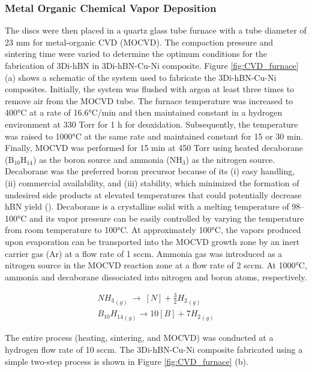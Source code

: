 \subsubsection{Metal Organic Chemical Vapor Deposition}

The discs were then placed in a quartz glass tube furnace with a tube diameter of 23 mm for metal-organic CVD (MOCVD). The compaction pressure and sintering time were varied to determine the optimum conditions for the fabrication of 3Di-hBN in  3Di-hBN-Cu-Ni composite.
Figure \ref{fig:CVD_furnace} (a) shows a schematic of the system used to fabricate the 3Di-hBN-Cu-Ni composites. Initially, the system was flushed with argon at least three times to remove air from the MOCVD tube. The furnace temperature was increased to 400°C at a rate of 16.6°C/min and then maintained constant in a hydrogen environment at 330 Torr for 1 h for deoxidation. Subsequently, the temperature was raised to 1000°C at the same rate and maintained constant for 15 or 30 min. Finally, MOCVD was performed for 15 min at 450 Torr using heated decaborane ($\text{B}_{10}\text{H}_{14}$) as the boron source and ammonia (N$\text{H}_{3}$) as the nitrogen source. Decaborane was the preferred boron precursor because of its (i) easy handling, (ii) commercial availability, and (iii) stability, which minimized the formation of undesired side products at elevated temperatures that could potentially decrease hBN yield (\cite{chatterjee2012syntheses}). Decaborane is a crystalline solid with a melting temperature of 98–100°C and its vapor pressure can be easily controlled by varying the temperature from room temperature to 100°C. At approximately 100°C, the vapors produced upon evaporation can be transported into the MOCVD growth zone by an inert carrier gas (Ar) at a flow rate of 1 sccm. Ammonia gas was introduced as a nitrogen source in the MOCVD reaction zone at a flow rate of 2 sccm. At 1000°C, ammonia and decaborane dissociated into nitrogen and boron atoms, respectively.

\begin{gather}
\label{eq:ammonia_dissociation}
{NH_3}_{\left(g\right)}\ \rightarrow\ \left[N\right]+\frac{3}{2}{H_2}_{\left(g\right)}
\\
\label{eq:boron_dissociation}
{B_{10}H_{14}}_{\left(g\right)}\rightarrow10[B]+7{H_2}_{\left(g\right)}
\end{gather}

The entire process (heating, sintering, and MOCVD) was conducted at a hydrogen flow rate of 10 sccm. The 3Di-hBN-Cu-Ni composite fabricated using a simple two-step process is shown in Figure \ref{fig:CVD_furnace} (b).

